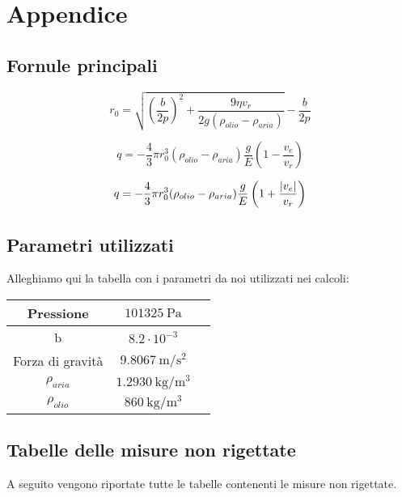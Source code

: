 \section{Appendice}
\subsection{Fornule principali}
    \begin{equation}
    \label{raggio}
        r_0 = \sqrt{\left( \frac{b}{2p} \right)^2 + \frac{9\eta v_r}{2g(\rho_{olio} - \rho_{aria})}} -  \frac{b}{2p}
    \end{equation}

    \begin{equation}
    \label{caricapos}
        q = -\frac{4}{3}\pi r_0^3 (\rho_{olio} - \rho_{aria}) \frac{g}{E}\left( 1 - \frac{v_e}{v_r} \right)
    \end{equation}

    \begin{equation}
    \label{caricaneg}
        q = -\frac{4}{3}\pi r_0^3 (\rho_{olio} - \rho_{aria}) \frac{g}{E}\left( 1 + \frac{\abs{v_e}}{v_r} \right)
    \end{equation}
\subsection{Parametri utilizzati}
Alleghiamo qui la tabella con i parametri da noi utilizzati nei calcoli:
    \begin{center}
        \begin{tabular}{ |c|c|c| }
             \hline
             Pressione & $101325~\mathrm{Pa}$ \\
             \hline
             b & $8.2\cdot10^{-3}$ \\
             \hline
             Forza di gravità & $9.8067~\mathrm{m/s^2}$ \\ 
             \hline
             $\rho_{aria}$ & $1.2930~\mathrm{kg/m^3}$ \\ 
             \hline
             $\rho_{olio}$ & $860~\mathrm{kg/m^3}$ \\ 
             \hline
        \end{tabular}
    \end{center}
    \subsection{Tabelle delle misure non rigettate}
    A seguito vengono riportate tutte le tabelle contenenti le misure non rigettate.
        
        
        